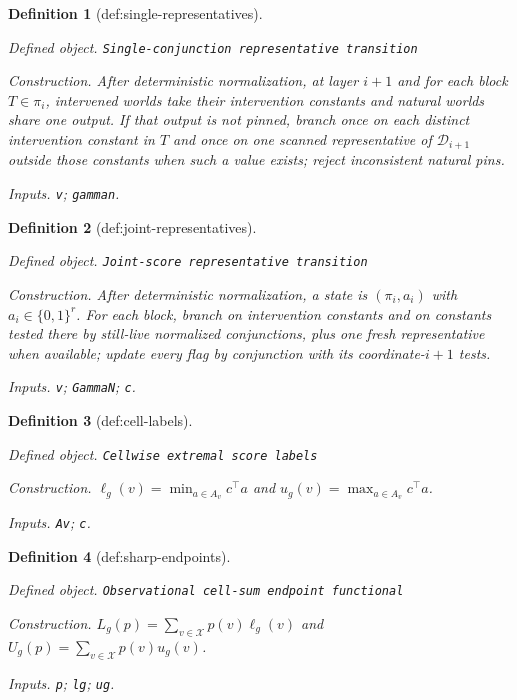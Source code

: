 \documentclass{article}
\newtheorem{definition}{Definition}
\begin{document}
\begin{definition}[def:single-representatives]\label{def:single-representatives}
\par\smallskip\noindent\emph{Defined object.} \texttt{Single-\allowbreak{}conjunction representative transition}
\par\smallskip\noindent\emph{Construction.} After deterministic normalization, at layer \(i+1\) and for each block \(T\in\pi_i\), intervened worlds take their intervention constants and natural worlds share one output. If that output is not pinned, branch once on each distinct intervention constant in \(T\) and once on one scanned representative of \(\mathcal D_{i+1}\) outside those constants when such a value exists; reject inconsistent natural pins.
\par\smallskip\noindent\emph{Inputs.} \texttt{v}; \texttt{gamman}.
\end{definition}

\begin{definition}[def:joint-representatives]\label{def:joint-representatives}
\par\smallskip\noindent\emph{Defined object.} \texttt{Joint-\allowbreak{}score representative transition}
\par\smallskip\noindent\emph{Construction.} After deterministic normalization, a state is \(\left(\pi_i,a_i\right)\) with \(a_i\in\{0,1\}^r\). For each block, branch on intervention constants and on constants tested there by still-live normalized conjunctions, plus one fresh representative when available; update every flag by conjunction with its coordinate-\(i+1\) tests.
\par\smallskip\noindent\emph{Inputs.} \texttt{v}; \texttt{GammaN}; \texttt{c}.
\end{definition}

\begin{definition}[def:cell-labels]\label{def:cell-labels}
\par\smallskip\noindent\emph{Defined object.} \texttt{Cellwise extremal score labels}
\par\smallskip\noindent\emph{Construction.} \(\ell_g(v)=\min_{a\in A_v}c^\top a\) and \(u_g(v)=\max_{a\in A_v}c^\top a\).
\par\smallskip\noindent\emph{Inputs.} \texttt{Av}; \texttt{c}.
\end{definition}

\begin{definition}[def:sharp-endpoints]\label{def:sharp-endpoints}
\par\smallskip\noindent\emph{Defined object.} \texttt{Observational cell-\allowbreak{}sum endpoint functional}
\par\smallskip\noindent\emph{Construction.} \(L_g(p)=\sum_{v\in\mathcal X}p(v)\ell_g(v)\) and \(U_g(p)=\sum_{v\in\mathcal X}p(v)u_g(v)\).
\par\smallskip\noindent\emph{Inputs.} \texttt{p}; \texttt{lg}; \texttt{ug}.
\end{definition}
\end{document}
